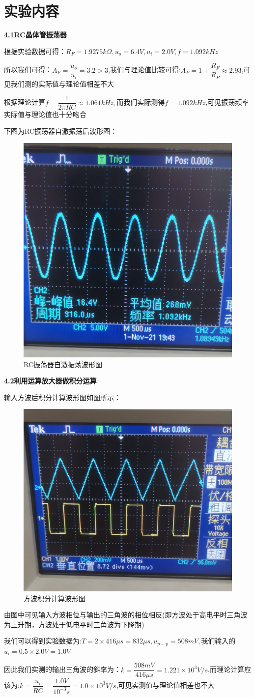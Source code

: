 \documentclass[a4 paper,12pt]{article}
\begin{document}
	\section{实验内容}
    \noindent
\textbf{4.1\quad RC晶体管振荡器}
\par 根据实验数据可得：$R_{F}=1.9275k\Omega,u_{o}=6.4V,u_{i}=2.0V,f=1.092kHz$
\par 所以我们可得：$A_{F}=\dfrac{u_{o}}{u_{i}}=3.2>3$,我们与理论值比较可得:$A_{F}=1+\dfrac{R_{F}}{R_{P}}\approx 2.93$,可见我们测的实际值与理论值相差不大
\par 根据理论计算$f=\dfrac{1}{2\pi RC}\approx1.061kHz,$而我们实际测得$f=1.092kHz$,可见振荡频率实际值与理论值也十分吻合
\par 下图为RC振荡器自激振荡后波形图：
		\begin{figure}[H]
		\centering
		\hspace{2em}\includegraphics[width=.4\linewidth]{pic/1.jpg}
		\caption{\small{RC振荡器自激振荡波形图}
		}
	\end{figure}
\noindent    
\textbf{4.2\quad 利用运算放大器做积分运算}
\par 输入方波后积分计算波形图如图所示：
		\begin{figure}[H]
		\centering
		\hspace{2em}\includegraphics[width=.4\linewidth]{pic/2.jpg}
		\caption{\small{方波积分计算波形图}
		}
	\end{figure}
    \par 由图中可见输入方波相位与输出的三角波的相位相反(即方波处于高电平时三角波为上升期，方波处于低电平时三角波为下降期)
    \par 我们可以得到实验数据为:$T=2\times 416\mu s=832\mu s,u_{p-p}=508mV,$我们输入的$u_{i}=0.5\times 2.0V=1.0V$
    \par 因此我们实测的输出三角波的斜率为：$k=\dfrac{508mV}{416\mu s}=1.221\times 10^{3}V/s$,而理论计算应该为:$k=\dfrac{u_{i}}{RC}=\dfrac{1.0V}{10^{-3}s}=1.0\times 10^{3}V/s$,可见实测值与理论值相差也不大
    
\end{document}
